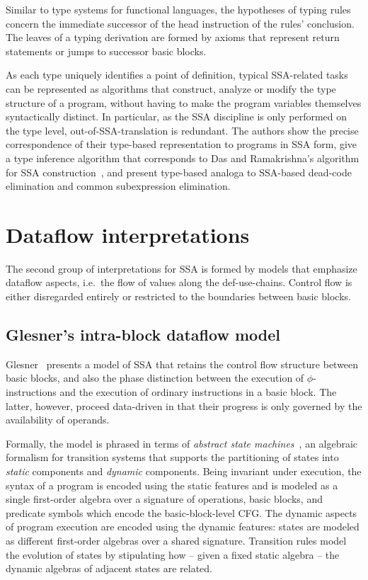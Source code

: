 Similar to type systems for functional languages, the hypotheses of
typing rules concern the immediate successor of the head instruction
of the rules' conclusion. The leaves of a typing derivation are formed
by axioms that represent return statements or jumps to successor basic
blocks.

As each type uniquely identifies a point of definition, typical
SSA-related tasks can be represented as algorithms that construct,
analyze or modify the type structure of a program, without having to
make the program variables themselves syntactically distinct.  In
particular, as the SSA discipline is only performed on the type level,
out-of-SSA-translation is redundant.  The authors show the precise
correspondence of their type-based representation to programs in SSA
form, give a type inference algorithm that corresponds to Das and
Ramakrishna's algorithm for SSA construction~\cite{DasRamakrishna},
and present type-based analoga to SSA-based dead-code elimination and
common subexpression elimination.

\section{Dataflow interpretations}
\label{section:Part1:Semantics:Dataflow}
The second group of interpretations for SSA is formed by models that
emphasize dataflow aspects, i.e.~the flow of values along the
def-use-chains. Control flow is either disregarded entirely or
restricted to the boundaries between basic blocks.

\subsection{Glesner's intra-block dataflow model}
Glesner~\cite{DBLP:conf/asm/Glesner04} presents a model of SSA that
retains the control flow structure between basic blocks, and also the
phase distinction between the execution of $\phi$-instructions and the
execution of ordinary instructions in a basic block. The latter,
however, proceed data-driven in that their progress is only governed
by the availability of operands.

Formally, the model is phrased in terms of \emph{abstract state
machines}~\cite{DBLP:journals/tocl/Gurevich00}, an algebraic formalism
for transition systems that supports the partitioning of states into
\emph{static} components and
\emph{dynamic} components. Being invariant under execution, the syntax
of a program is encoded using the static features and is modeled as a
single first-order algebra over a signature of operations, basic
blocks, and predicate symbols which encode the basic-block-level
CFG. The dynamic aspects of program execution are encoded using the
dynamic features: states are modeled as different first-order algebras
over a shared signature. Transition rules model the evolution of
states by stipulating how -- given a fixed static algebra -- the
dynamic algebras of adjacent states are related.

